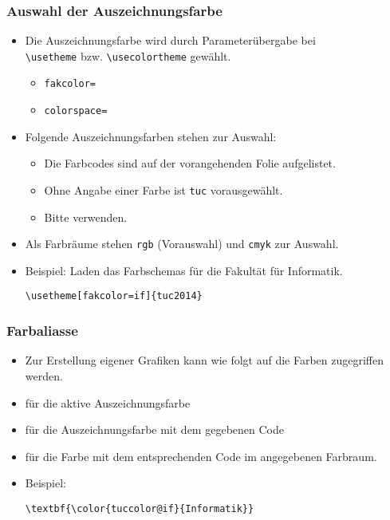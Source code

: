 \begin{frame}[containsverbatim]
\frametitle{Auswahl der Auszeichnungsfarbe}

\begin{itemize}
\item Die Auszeichnungsfarbe wird durch Parameterübergabe bei \\
      \lstinline[language={[LaTeX]TeX}]{\usetheme} bzw.
      \lstinline[language={[LaTeX]TeX}]{\usecolortheme} gewählt.
  \begin{itemize}
  \item \texttt{fakcolor=}
  \item \texttt{colorspace=}
  \end{itemize}

\item Folgende Auszeichnungsfarben stehen zur Auswahl:
  \begin{itemize}
  \item Die Farbcodes sind auf der vorangehenden Folie aufgelistet.
  \item Ohne Angabe einer Farbe ist \texttt{tuc} vorausgewählt.
  \item Bitte  verwenden.
  \end{itemize}

\item Als Farbräume stehen \texttt{rgb} (Vorauswahl) und \texttt{cmyk} zur Auswahl.

\bigskip

\item Beispiel: Laden das Farbschemas für die Fakultät für Informatik.
\begin{lstlisting}[style=block,language={[LaTeX]TeX}]
\usetheme[fakcolor=if]{tuc2014}
\end{lstlisting}
\end{itemize}
\end{frame}


\begin{frame}[containsverbatim]
\frametitle{Farbaliasse}

\begin{itemize}
\item Zur Erstellung eigener Grafiken kann wie folgt auf die Farben zugegriffen werden.
\bigskip
\item {} für die aktive Auszeichnungsfarbe
\item {} für die Auszeichnungsfarbe
      mit dem gegebenen Code
\item {} 
      für die Farbe mit dem entsprechenden Code im angegebenen Farbraum.
\bigskip
\item Beispiel: \textbf{\color{tuccolor@if}{Informatik}}
\begin{lstlisting}[style=block,language={[LaTeX]TeX}]
\textbf{\color{tuccolor@if}{Informatik}}
\end{lstlisting}
\end{itemize}
\end{frame}


